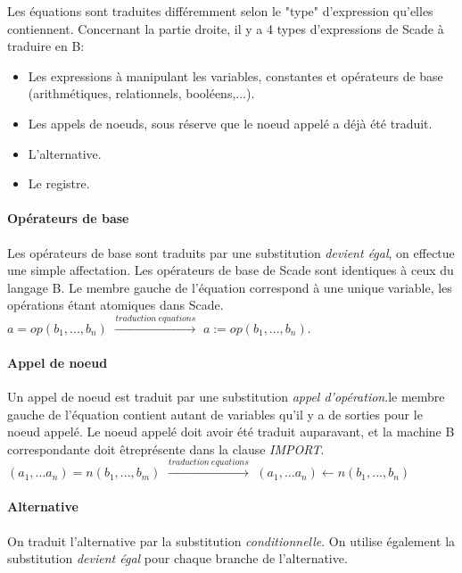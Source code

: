Les équations sont traduites différemment selon le "type" d'expression qu'elles
contiennent.  
Concernant la partie droite, il y a 4 types d'expressions de Scade à traduire en B:
\begin{itemize}
\item Les expressions à manipulant les variables, constantes et opérateurs de
  base (arithmétiques, relationnels, booléens,...).
\item Les appels de noeuds, sous réserve que le noeud appelé a déjà été
  traduit. 
\item L'alternative.
\item Le registre.
\end{itemize}

\paragraph{Opérateurs de base}
Les opérateurs de base sont traduits par une substitution \emph{devient égal}, on
effectue une simple affectation. Les opérateurs de base de Scade sont identiques
à ceux du langage B. Le membre gauche de l'équation correspond à une unique
variable, les opérations étant atomiques dans Scade. \\

$a = op(b_1,...,b_n)$ $\xrightarrow{traduction ~ equations}$ $a:=op(b_1,...,b_n)$. 

\paragraph{Appel de noeud}
Un appel de noeud est traduit par une substitution \emph{appel d'opération}.le
membre gauche de l'équation contient autant de variables qu'il y a de sorties
pour le noeud appelé. Le noeud appelé doit avoir été traduit auparavant, et la
machine B correspondante doit êtreprésente dans la clause \emph{IMPORT}.\\

$(a_1, ... a_n) = n(b_1, ..., b_m)$ $\xrightarrow{traduction ~ equations}$ $(a_1, ... a_n) \leftarrow n(b_1,
..., b_n)$

\paragraph{Alternative}
On traduit l'alternative par la substitution \emph{conditionnelle}. On utilise
également la substitution \emph{devient égal} pour chaque branche de l'alternative.\\

